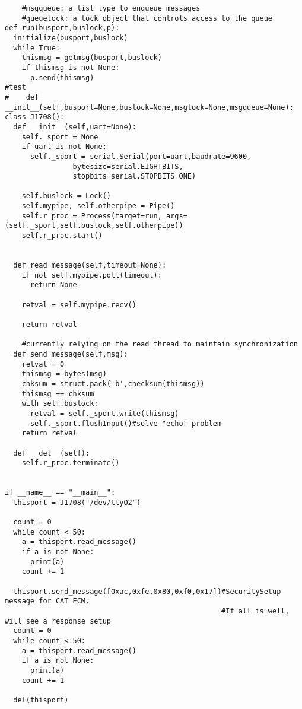 \begin{verbatim}
    #msgqueue: a list type to enqueue messages
    #queuelock: a lock object that controls access to the queue
def run(busport,buslock,p):
  initialize(busport,buslock)
  while True:
    thismsg = getmsg(busport,buslock)
    if thismsg is not None:
      p.send(thismsg)
#test
#    def __init__(self,busport=None,buslock=None,msglock=None,msgqueue=None):
class J1708():
  def __init__(self,uart=None):
    self._sport = None
    if uart is not None:
      self._sport = serial.Serial(port=uart,baudrate=9600,
                bytesize=serial.EIGHTBITS,
                stopbits=serial.STOPBITS_ONE)

    self.buslock = Lock()
    self.mypipe, self.otherpipe = Pipe()
    self.r_proc = Process(target=run, args=(self._sport,self.buslock,self.otherpipe))
    self.r_proc.start()


  def read_message(self,timeout=None):
    if not self.mypipe.poll(timeout):
      return None

    retval = self.mypipe.recv()

    return retval

    #currently relying on the read_thread to maintain synchronization
  def send_message(self,msg):
    retval = 0
    thismsg = bytes(msg)
    chksum = struct.pack('b',checksum(thismsg))
    thismsg += chksum
    with self.buslock:
      retval = self._sport.write(thismsg)
      self._sport.flushInput()#solve "echo" problem
    return retval
     
  def __del__(self):
    self.r_proc.terminate()


if __name__ == "__main__":
  thisport = J1708("/dev/ttyO2")
  
  count = 0
  while count < 50:
    a = thisport.read_message()
    if a is not None:
      print(a)
    count += 1

  thisport.send_message([0xac,0xfe,0x80,0xf0,0x17])#SecuritySetup message for CAT ECM.
                                                   #If all is well, will see a response setup
  count = 0
  while count < 50:
    a = thisport.read_message()
    if a is not None:
      print(a)
    count += 1

  del(thisport)
\end{verbatim}

\label{app:schematic}

%

